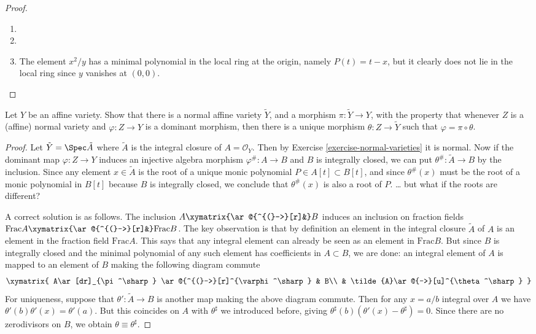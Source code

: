 \documentclass{book}
\begin{document}
\begin{proof}
\begin{enumerate}
\item
\item
\item The element $x^2/y$ has a minimal
polynomial in the local ring at the origin,
namely $P(t)=t-x$, but it clearly
does not lie in the local ring since $y$
vanishes at $(0,0)$.
\end{enumerate}
\end{proof}

\begin{exercise}
\label{exercise-normalization}
Let $Y$ be an affine variety.
Show that there is a normal affine
variety $\tilde{Y}$, and a morphism
$\pi:\tilde{Y}\to Y$,
with the property that whenever $Z$
is a (affine) normal variety and 
$\varphi:Z \to Y$ is a dominant morphism,
then there is a unique morphism
$\theta:Z \to \tilde{Y}$ such that
$\varphi=\pi \circ \theta$.
\end{exercise}

\begin{proof}
Let $\tilde{Y}=\Spec \tilde{A}$
where $\tilde{A}$ is the integral closure
of $A=\mathcal{O}_Y$.
Then by Exercise
\ref{exercise-normal-varieties}
it is normal.
Now if the dominant map $\varphi:Z \to Y$
induces an injective algebra morphism
$\varphi^\#:A \to B$
and $B$ is integrally closed,
we can put $\theta^\#:\tilde{A} \to B$
by the inclusion.
Since any element $x \in \tilde{A}$
is the root of a unique monic polynomial
$P \in A[t] \subset B[t]$,
and since $\theta^\#(x)$ must be
the root of a monic polynomial in $B[t]$
because $B$ is integrally closed,
we conclude that $\theta^\#(x)$
is also a root of $P$.
… but what if the roots are different?

A correct solution is as follows.
The inclusion $A \xymatrix{\ar@{^{(}->}[r]&}
B$ induces an inclusion on fraction fields
$\text{Frac}A \xymatrix{\ar@{^{(}->}[r]&}
\text{Frac} B$.
The key observation is that by definition
an element in the integral closure 
$\tilde{A}$ of $A$ is an element in
the fraction field $\text{Frac} A$.
This says that any integral element
can already be seen as an element in
$\text{Frac}B$.
But since $B$ is integrally closed and the
minimal polynomial of any such element
has coefficients in $A \subset B$,
we are done: an integral element of $A$
is mapped to an element of $B$ making
the following diagram commute
$$
\xymatrix{
A\ar[dr]_{\pi^\sharp}
\ar@{^{(}->}[r]^{\varphi^\sharp}
&  B\\
&  \tilde{A}\ar@{-->}[u]^{\theta^\sharp}
}
$$
For uniqueness, suppose that
$\theta':\tilde{A} \to B$ is another
map making the above diagram commute.
Then for any $x=a/b$ integral over $A$ 
we have
$\theta'(b)\theta'(x)=\theta'(a)$.
But this coincides on $A$
with $\theta^\sharp$
we introduced before, giving
$\theta^\sharp(b)(\theta'(x)-\theta^\sharp)
=0$. Since there are no zerodivisors on $B$,
we obtain $\theta\equiv\theta^\sharp$.
\end{proof}
\end{document}
